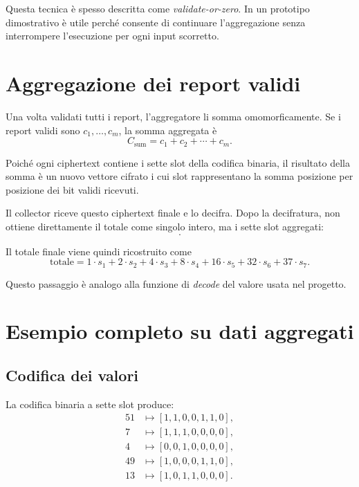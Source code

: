 Questa tecnica \`e spesso descritta come \emph{validate-or-zero}. In un prototipo dimostrativo \`e utile perch\'e consente di continuare l'aggregazione senza interrompere l'esecuzione per ogni input scorretto.

\section{Aggregazione dei report validi}
Una volta validati tutti i report, l'aggregatore li somma omomorficamente. Se i report validi sono $c_1,\dots,c_m$, la somma aggregata \`e
\begin{equation}
C_{\text{sum}} = c_1 + c_2 + \cdots + c_m.
\end{equation}

Poich\'e ogni ciphertext contiene i sette slot della codifica binaria, il risultato della somma \`e un nuovo vettore cifrato i cui slot rappresentano la somma posizione per posizione dei bit validi ricevuti.

Il collector riceve questo ciphertext finale e lo decifra. Dopo la decifratura, non ottiene direttamente il totale come singolo intero, ma i sette slot aggregati:
\begin{equation}
[s_1,s_2,s_3,s_4,s_5,s_6,s_7].
\end{equation}

Il totale finale viene quindi ricostruito come
\begin{equation}
\text{totale} =
1\cdot s_1 +
2\cdot s_2 +
4\cdot s_3 +
8\cdot s_4 +
16\cdot s_5 +
32\cdot s_6 +
37\cdot s_7.
\end{equation}

Questo passaggio \`e analogo alla funzione di \emph{decode} del valore usata nel progetto.

\section{Esempio completo su dati aggregati}
\subsection{Codifica dei valori}
La codifica binaria a sette slot produce:
\begin{align}
51 &\longmapsto [1,1,0,0,1,1,0], \\
7 &\longmapsto [1,1,1,0,0,0,0], \\
4 &\longmapsto [0,0,1,0,0,0,0], \\
49 &\longmapsto [1,0,0,0,1,1,0], \\
13 &\longmapsto [1,0,1,1,0,0,0].
\end{align}

